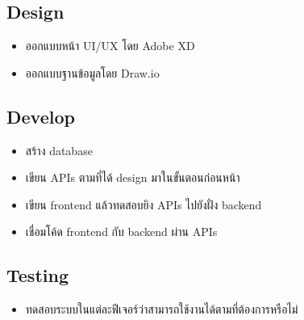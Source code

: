 \subsection{Design}
\begin{itemize}
  \item ออกแบบหน้า UI/UX โดย Adobe XD
  \item ออกแบบฐานข้อมูลโดย Draw.io
\end{itemize}

\subsection{Develop}
\begin{itemize}
  \item สร้าง database
  \item เขียน APIs ตามที่ได้ design มาในขั้นตอนก่อนหน้า
  \item เขียน frontend แล้วทดสอบยิง APIs ไปยังฝั่ง backend
  \item เชื่อมโค้ด frontend กับ backend ผ่าน APIs
\end{itemize}

\subsection{Testing}
\begin{itemize}
  \item ทดสอบระบบในแต่ละฟีเจอร์ว่าสามารถใช้งานได้ตามที่ต้องการหรือไม่
\end{itemize}


